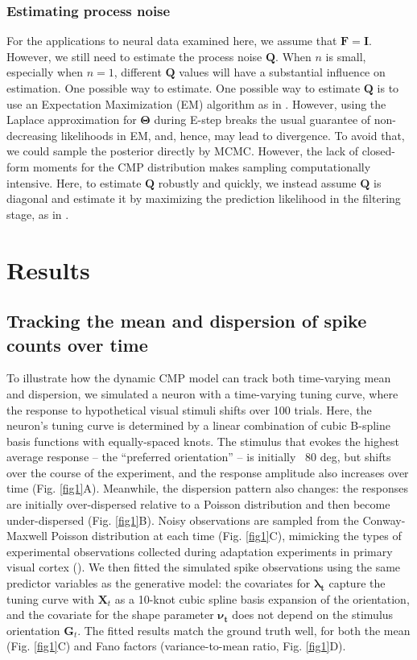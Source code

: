 \documentclass[aoas]{imsart}
\theoremstyle{plain}
\theoremstyle{remark}
\begin{document}
\subsubsection{Estimating process noise}
\label{estQ}
For the applications to neural data examined here, we assume that $\bm{F}=\bm{I}$. However, we still need to estimate the process noise $\bm{Q}$. When $n$ is small, especially when $n=1$, different $\bm{Q}$ values will have a substantial influence on estimation. One possible way to estimate. One possible way to estimate $\bm{Q}$ is to use an Expectation Maximization (EM) algorithm as in \cite{Macke2011}. However, using the Laplace approximation for $\bm{\Theta}$ during E-step breaks the usual guarantee of non-decreasing likelihoods in EM, and, hence, may lead to divergence. To avoid that, we could sample the posterior directly by MCMC. However, the lack of closed-form moments for the CMP distribution makes sampling computationally intensive. Here, to estimate $\bm{Q}$ robustly and quickly, we instead assume $\bm{Q}$ is diagonal and estimate it by maximizing the prediction likelihood in the filtering stage, as in \cite{Wei2021}. 

\section{Results}

\subsection{Tracking the mean and dispersion of spike counts over time}
To illustrate how the dynamic CMP model can track both time-varying mean and dispersion, we simulated a neuron with a time-varying tuning curve, where the response to hypothetical visual stimuli shifts over 100 trials. Here, the neuron’s tuning curve is determined by a linear combination of cubic B-spline basis functions with equally-spaced knots. The stimulus that evokes the highest average response – the “preferred orientation” – is initially ~80 deg, but shifts over the course of the experiment, and the response amplitude also increases over time (Fig. \ref{fig1}A). Meanwhile, the dispersion pattern also changes: the responses are initially over-dispersed relative to a Poisson distribution and then become under-dispersed (Fig. \ref{fig1}B). Noisy observations are sampled from the Conway-Maxwell Poisson distribution at each time (Fig. \ref{fig1}C), mimicking the types of experimental observations collected during adaptation experiments in primary visual cortex (\cite{Dragoi2000}). We then fitted the simulated spike observations using the same predictor variables as the generative model: the covariates for $\bm{\lambda_t}$ capture the tuning curve with $\bm{X}_t$ as a 10-knot cubic spline basis expansion of the orientation, and the covariate for the shape parameter $\bm{\nu_t}$ does not depend on the stimulus orientation $\bm{G}_t$. The fitted results match the ground truth well, for both the mean (Fig. \ref{fig1}C) and Fano factors (variance-to-mean ratio, Fig. \ref{fig1}D).
\end{document}
